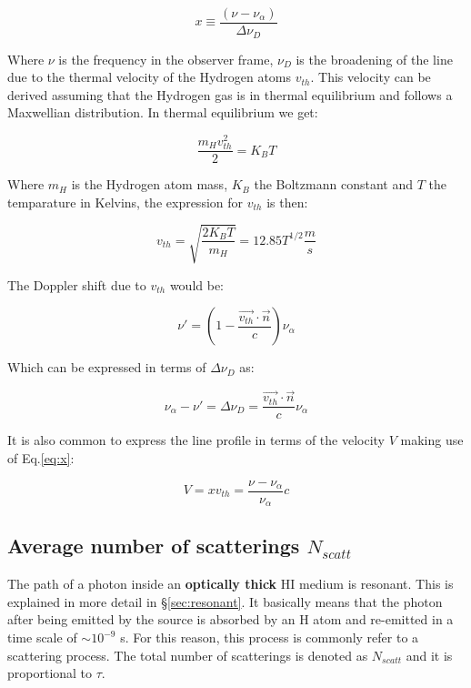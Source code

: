 \begin{equation}\label{eq:x}
x   \equiv \dfrac{(\nu -\nu_{\alpha})}{\Delta \nu_D}
\end{equation}

Where $\nu$ is the frequency in the observer frame,
$\nu_D$ is the broadening of the line due to the thermal
velocity of the Hydrogen atoms $v_{th}$. This velocity can be derived
assuming that the Hydrogen gas is in thermal equilibrium
and follows a Maxwellian distribution. In thermal equilibrium
we get:

\begin{equation}
\dfrac{m_H v_{th}^2}{2} = K_B T 
\end{equation}

Where $m_H$ is the Hydrogen atom mass, $K_B$ the Boltzmann constant and $T$
the temparature in Kelvins, the expression for $v_{th}$ is then:

\begin{equation}
v_{th} = \sqrt{\dfrac{2 K_B T}{m_H}} = 12.85 T^{1/2}\dfrac{m}{s}
\end{equation}

The Doppler shift due to $v_{th}$ would be:

\begin{equation}
\nu'= (1 - \dfrac{\vec{v_{th}}\cdot\vec{n}}{c})\nu_{\alpha}
\end{equation}

Which can be expressed in terms of $\Delta \nu_D$ as:

\begin{equation}
\nu_{\alpha} - \nu' = \Delta\nu_D =  \dfrac{\vec{v_{th}}\cdot\vec{n}}{c} \nu_{\alpha}
\end{equation}

It is also common to express the line profile in terms of the velocity $V$
making use of Eq.\ref{eq:x}:

\begin{equation}
V = xv_{th} = \dfrac{\nu - \nu_{\alpha}}{\nu_{\alpha}}c
\end{equation}

\subsection{Average number of scatterings $N_{scatt}$}

The path of a \ly photon inside an {\bf{optically thick}}
HI medium is resonant. This is explained in more detail 
in \S \ref{sec:resonant}. It basically means that the \ly photon
after being emitted by the source is absorbed by an H atom
and re-emitted in a time scale of $\sim 10^{-9}$ s.
For this reason, this process is commonly refer to
a scattering process. The total number of scatterings
is denoted as $N_{scatt}$ and it is proportional to
$\tau$.



